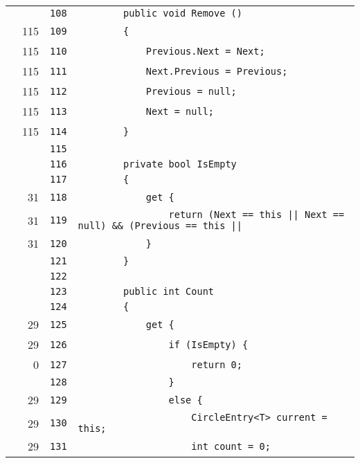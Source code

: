 \documentclass[a4paper,10pt]{article}
\begin{document}
\begin{longtable}[l]{lrrl}
\cellcolor{gray} &  & \verb~108~ & \verb~        public void Remove ()~\\
\cellcolor{green} & 115 & \verb~109~ & \verb~        {~\\
\cellcolor{green} & 115 & \verb~110~ & \verb~            Previous.Next = Next;~\\
\cellcolor{green} & 115 & \verb~111~ & \verb~            Next.Previous = Previous;~\\
\cellcolor{green} & 115 & \verb~112~ & \verb~            Previous = null;~\\
\cellcolor{green} & 115 & \verb~113~ & \verb~            Next = null;~\\
\cellcolor{green} & 115 & \verb~114~ & \verb~        }~\\
\cellcolor{gray} &  & \verb~115~ & \verb~~\\
\cellcolor{gray} &  & \verb~116~ & \verb~        private bool IsEmpty~\\
\cellcolor{gray} &  & \verb~117~ & \verb~        {~\\
\cellcolor{green} & 31 & \verb~118~ & \verb~            get {~\\
\cellcolor{green} & 31 & \verb~119~ & \verb~                return (Next == this || Next == null) && (Previous == this || ~\\
\cellcolor{green} & 31 & \verb~120~ & \verb~            }~\\
\cellcolor{gray} &  & \verb~121~ & \verb~        }~\\
\cellcolor{gray} &  & \verb~122~ & \verb~~\\
\cellcolor{gray} &  & \verb~123~ & \verb~        public int Count~\\
\cellcolor{gray} &  & \verb~124~ & \verb~        {~\\
\cellcolor{green} & 29 & \verb~125~ & \verb~            get {~\\
\cellcolor{green} & 29 & \verb~126~ & \verb~                if (IsEmpty) {~\\
\cellcolor{red} & 0 & \verb~127~ & \verb~                    return 0;~\\
\cellcolor{gray} &  & \verb~128~ & \verb~                }~\\
\cellcolor{green} & 29 & \verb~129~ & \verb~                else {~\\
\cellcolor{green} & 29 & \verb~130~ & \verb~                    CircleEntry<T> current = this;~\\
\cellcolor{green} & 29 & \verb~131~ & \verb~                    int count = 0;~\\

\end{longtable}
\end{document}
